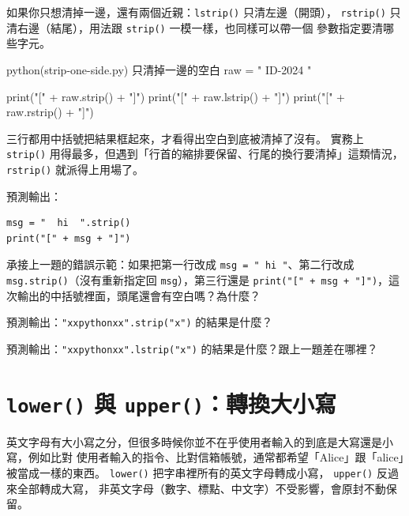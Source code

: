 如果你只想清掉一邊，還有兩個近親：\texttt{lstrip()} 只清左邊（開頭），
\texttt{rstrip()} 只清右邊（結尾），用法跟 \texttt{strip()} 一模一樣，也同樣可以帶一個
參數指定要清哪些字元。

\begin{example}{python}{(strip-one-side.py) 只清掉一邊的空白}
raw = "   ID-2024   "

print("[" + raw.strip() + "]")
print("[" + raw.lstrip() + "]")
print("[" + raw.rstrip() + "]")
\end{example}

\iosample{}{[ID-2024] \\{} [ID-2024   ] \\{} [   ID-2024] \\}

三行都用中括號把結果框起來，才看得出空白到底被清掉了沒有。 實務上
\texttt{strip()} 用得最多，但遇到「行首的縮排要保留、行尾的換行要清掉」這類情況，
\texttt{rstrip()} 就派得上用場了。

\begin{drills}[label=drills:strip-method]
\item 預測輸出：
\begin{verbatim}
msg = "  hi  ".strip()
print("[" + msg + "]")
\end{verbatim}
\item 承接上一題的錯誤示範：如果把第一行改成 \texttt{msg = "  hi  "}、第二行改成
\texttt{msg.strip()}（沒有重新指定回 \texttt{msg}），第三行還是
\texttt{print("[" + msg + "]")}，這次輸出的中括號裡面，頭尾還會有空白嗎？為什麼？
\item 預測輸出：\texttt{"xxpythonxx".strip("x")} 的結果是什麼？
\item 預測輸出：\texttt{"xxpythonxx".lstrip("x")} 的結果是什麼？跟上一題差在哪裡？
\end{drills}

\section{\texttt{lower()} 與 \texttt{upper()}：轉換大小寫}
\label{sec:case-methods}

英文字母有大小寫之分，但很多時候你並不在乎使用者輸入的到底是大寫還是小寫，例如比對
使用者輸入的指令、比對信箱帳號，通常都希望「Alice」跟「alice」被當成一樣的東西。
\texttt{lower()} 把字串裡所有的英文字母轉成小寫，
\texttt{upper()} 反過來全部轉成大寫，
非英文字母（數字、標點、中文字）不受影響，會原封不動保留。

